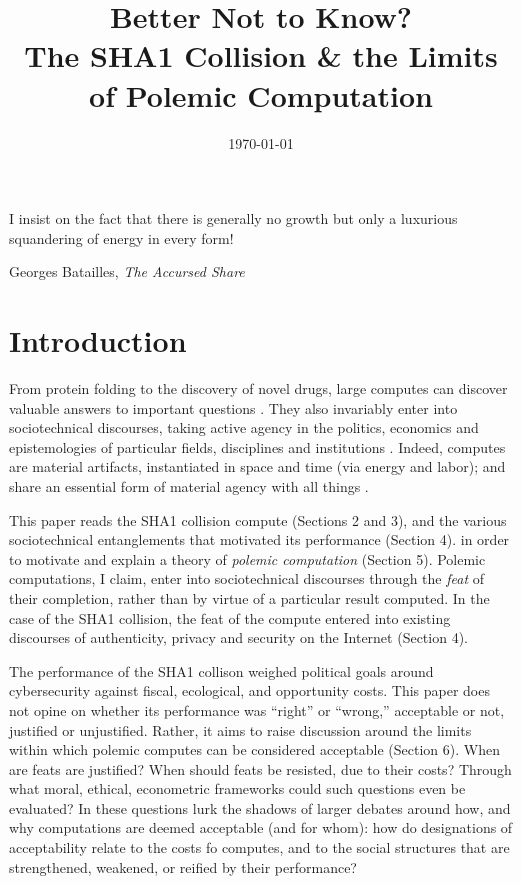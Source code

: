 \documentclass[sigconf]{acmart}
\date{\today}
\title{Better Not to Know?\\\medskip
\large The SHA1 Collision \& the Limits of Polemic Computation}
\begin{document}
\maketitle

\epigraph{I insist on the fact that there is generally no growth but only a luxurious squandering of energy in every form!}{Georges Batailles, \textit{The Accursed Share}}


\section{Introduction}
\label{sec:org44c5636}

From protein folding to the discovery of novel drugs,
large computes can discover valuable answers to important questions
\cite{Anderson2004}.
They also invariably enter into sociotechnical discourses,
taking active agency in the politics, economics and epistemologies 
of particular fields, disciplines and institutions \cite{Ames2015}.
Indeed, computes are material artifacts, instantiated in space and time (via energy and labor);
and share an essential form of material agency with all things \cite{Bennett2013a,Winner2003}.

This paper reads the SHA1 collision compute (Sections 2 and 3), 
and the various sociotechnical entanglements that motivated its performance (Section 4).
in order to motivate and explain a theory of \emph{polemic computation} (Section 5).
Polemic computations, I claim, enter into sociotechnical discourses through the \emph{feat} of their completion, rather than by virtue of a particular result computed.
In the case of the SHA1 collision, the feat of the compute entered into existing discourses of authenticity, privacy and security on the Internet (Section 4).

The performance of the SHA1 collison weighed political goals around cybersecurity against fiscal, ecological, and opportunity costs.
This paper does not opine on whether its performance was ``right'' or ``wrong,'' acceptable or not, justified or unjustified.
Rather, it aims to raise discussion around the limits within which polemic computes can be considered acceptable (Section 6).
When are feats are justified? 
When should feats be resisted, due to their costs? 
Through what moral, ethical, econometric frameworks could such questions even be evaluated? 
In these questions lurk the shadows of larger debates around how, and why computations are deemed acceptable (and for whom):
how do designations of acceptability relate to the costs fo computes, and to the social structures that are strengthened, weakened, or reified by their performance?
\end{document}
